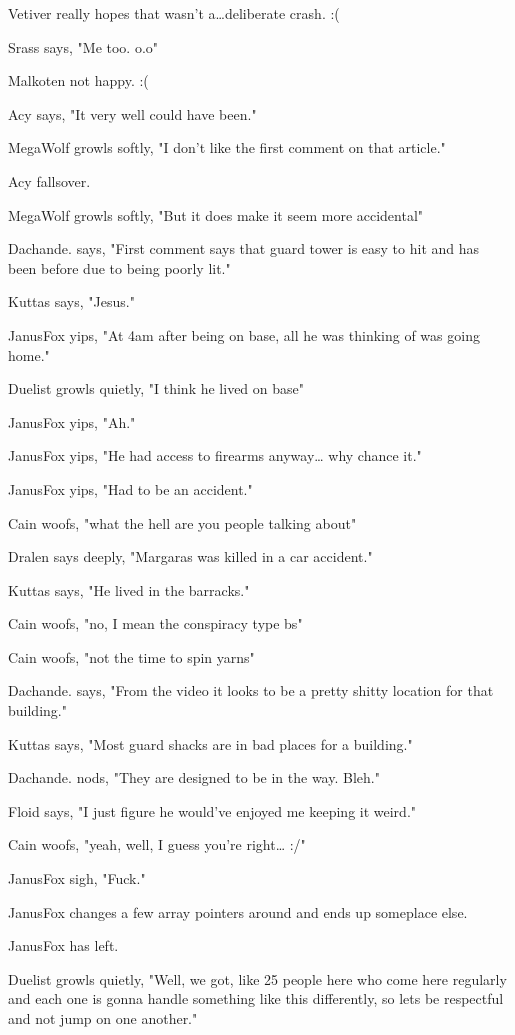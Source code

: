 \begin{hangparas}{2em}{1}
Vetiver really hopes that wasn't a\ldots{}deliberate crash. :(

Srass says, "Me too. o.o"

Malkoten not happy. :(

Acy says, "It very well could have been."

MegaWolf growls softly, "I don't like the first comment on that article."

Acy fallsover.

MegaWolf growls softly, "But it does make it seem more accidental"

Dachande. says, "First comment says that guard tower is easy to hit and has been before due to being poorly lit."

Kuttas says, "Jesus."

JanusFox yips, "At 4am after being on base, all he was thinking of was going home."

Duelist growls quietly, "I think he lived on base"

JanusFox yips, "Ah."

JanusFox yips, "He had access to firearms anyway\ldots{} why chance it."

JanusFox yips, "Had to be an accident."

Cain woofs, "what the hell are you people talking about"

Dralen says deeply, "Margaras was killed in a car accident."

Kuttas says, "He lived in the barracks."

Cain woofs, "no, I mean the conspiracy type bs"

Cain woofs, "not the time to spin yarns"

Dachande. says, "From the video it looks to be a pretty shitty location for that building."

Kuttas says, "Most guard shacks are in bad places for a building."

Dachande. nods, "They are designed to be in the way. Bleh."

Floid says, "I just figure he would've enjoyed me keeping it weird."

Cain woofs, "yeah, well, I guess you're right\ldots{} :/"

JanusFox sigh, "Fuck."

JanusFox changes a few array pointers around and ends up someplace else.

JanusFox has left.

Duelist growls quietly, "Well, we got, like 25 people here who come here regularly and each one is gonna handle something like this differently, so lets be respectful and not jump on one another."


\end{hangparas}
